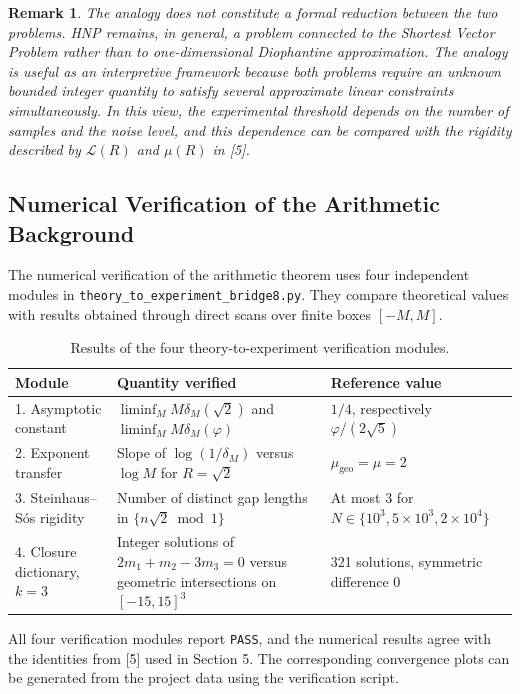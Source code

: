 \documentclass[11pt,a4paper]{article}
\newtheorem{remark}[theorem]{Remark}
\begin{document}
\begin{remark}
The analogy does not constitute a formal reduction between the two problems. HNP remains, in general, a problem connected to the Shortest Vector Problem rather than to one-dimensional Diophantine approximation. The analogy is useful as an interpretive framework because both problems require an unknown bounded integer quantity to satisfy several approximate linear constraints simultaneously. In this view, the experimental threshold depends on the number of samples and the noise level, and this dependence can be compared with the rigidity described by $\mathcal L(R)$ and $\mu(R)$ in [5].
\end{remark}

\subsection{Numerical Verification of the Arithmetic Background}

The numerical verification of the arithmetic theorem uses four independent modules in \texttt{theory\_to\_experiment\_bridge8.py}. They compare theoretical values with results obtained through direct scans over finite boxes $[-M,M]$.

\begin{table}[H]
\centering
\caption{Results of the four theory-to-experiment verification modules.}
\begin{tabular}{p{}p{}p{}}
\toprule
\textbf{Module} & \textbf{Quantity verified} & \textbf{Reference value}\\
\midrule
1. Asymptotic constant &
$\liminf_M M\delta_M(\sqrt2)$ and $\liminf_M M\delta_M(\varphi)$ &
$1/4$, respectively $\varphi/(2\sqrt5)$\\
2. Exponent transfer &
Slope of $\log(1/\delta_M)$ versus $\log M$ for $R=\sqrt2$ &
$\mu_{\mathrm{geo}}=\mu=2$\\
3. Steinhaus--Sós rigidity &
Number of distinct gap lengths in $\{n\sqrt2\bmod1\}$ &
At most 3 for $N\in\{10^3,5\times10^3,2\times10^4\}$\\
4. Closure dictionary, $k=3$ &
Integer solutions of $2m_1+m_2-3m_3=0$ versus geometric intersections on $[-15,15]^3$ &
321 solutions, symmetric difference 0\\
\bottomrule
\end{tabular}
\end{table}

All four verification modules report \texttt{PASS}, and the numerical results agree with the identities from [5] used in Section 5. The corresponding convergence plots can be generated from the project data using the verification script.
\end{document}
